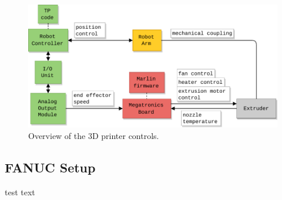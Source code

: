 \begin{figure}[t]
    \centering
    \includegraphics[width=.8\linewidth]{figures/diagrams/system overview}
    \caption{Overview of the 3D printer controls.}
    \label{fig:sys-overview}
\end{figure}

\subsection*{FANUC Setup}

test text\\
